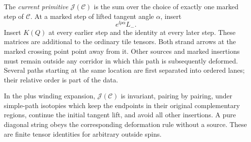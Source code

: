 The \emph{current primitive} $\mathcal J(\mathcal C)$ is the sum over the
choice of exactly one marked step of $\mathcal C$.  At a marked step of
lifted tangent angle $\alpha$, insert
\[
 e^{\ii\rho\alpha}L_-.
\]
Insert $K(Q)$ at every earlier step and the identity at every later step.
These matrices are additional to the ordinary tile tensors.  Both strand
arrows at the marked crossing point point away from it.  Other sources
and marked insertions must remain outside any corridor in which this
path is subsequently deformed.  Several paths starting at the same
location are first separated into ordered lanes; their relative order is
part of the data.

\begin{lemma}
\label{lem:current-identity}
In the plus winding expansion, $\mathcal J(\mathcal C)$ is invariant,
pairing by pairing, under simple-path isotopies which keep the endpoints
in their original complementary regions, continue the initial tangent
lift, and avoid all other insertions.  A pure diagonal string obeys the
corresponding deformation rule without a source.  These are finite tensor
identities for arbitrary outside spins.
\end{lemma}

